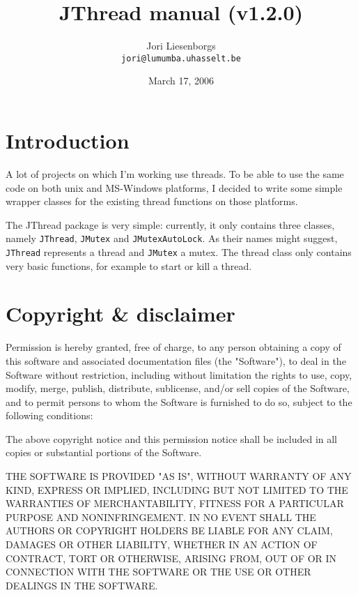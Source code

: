\documentclass[a4paper,12pt]{article}
\begin{document}
	\title{JThread manual (v1.2.0)}
	\author{Jori Liesenborgs\\
	        {\tt jori@lumumba.uhasselt.be} }
	\date{March 17, 2006}
	\maketitle

	\section{Introduction}

	A lot of projects on which I'm working use threads. To be able to
	use the same code on both unix and MS-Windows platforms, I decided
	to write some simple wrapper classes for the existing thread functions
	on those platforms.

	The JThread package is very simple: currently, it only contains three
	classes, namely {\tt JThread}, {\tt JMutex} and {\tt JMutexAutoLock}. 
	As their names might
	suggest, {\tt JThread} represents a thread and {\tt JMutex} a mutex.
	The thread class only contains very basic functions, for example to
	start or kill a thread.

	\section{Copyright \& disclaimer}

	Permission is hereby granted, free of charge, to any person obtaining a
	copy of this software and associated documentation files (the "Software"),
	to deal in the Software without restriction, including without limitation
	the rights to use, copy, modify, merge, publish, distribute, sublicense,
	and/or sell copies of the Software, and to permit persons to whom the
	Software is furnished to do so, subject to the following conditions:

	The above copyright notice and this permission notice shall be included
	in all copies or substantial portions of the Software.

	THE SOFTWARE IS PROVIDED "AS IS", WITHOUT WARRANTY OF ANY KIND, EXPRESS
	OR IMPLIED, INCLUDING BUT NOT LIMITED TO THE WARRANTIES OF MERCHANTABILITY,
	FITNESS FOR A PARTICULAR PURPOSE AND NONINFRINGEMENT.  IN NO EVENT SHALL
	THE AUTHORS OR COPYRIGHT HOLDERS BE LIABLE FOR ANY CLAIM, DAMAGES OR OTHER
	LIABILITY, WHETHER IN AN ACTION OF CONTRACT, TORT OR OTHERWISE, ARISING
	FROM, OUT OF OR IN CONNECTION WITH THE SOFTWARE OR THE USE OR OTHER DEALINGS
	IN THE SOFTWARE.
\end{document}
